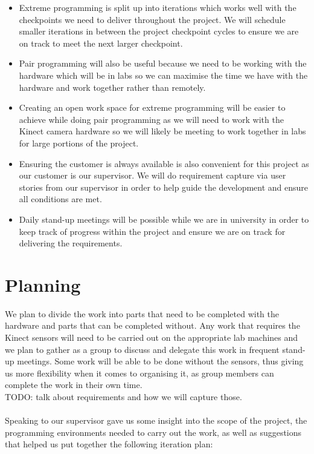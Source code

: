 \documentclass[a4paper,12pt]{article}
\begin{document}
\begin{itemize}
\item Extreme programming is split up into iterations which works well with the checkpoints we need to deliver throughout the project. We will schedule smaller iterations in between the project checkpoint cycles to ensure we are on track to meet the next larger checkpoint.
\item Pair programming will also be useful because we need to be working with the hardware which will be in labs so we can maximise the time we have with the hardware and work together rather than remotely.
\item Creating an open work space for extreme programming will be easier to achieve while doing pair programming as we will need to work with the Kinect camera hardware so we will likely be meeting to work together in labs for large portions of the project.
\item Ensuring the customer is always available is also convenient for this project as our customer is our supervisor. We will do requirement capture via user stories from our supervisor in order to help guide the development and ensure all conditions are met.
\item Daily stand-up meetings will be possible while we are in university in order to keep track of progress within the project and ensure we are on track for delivering the requirements.
\end{itemize}

\section*{Planning}
We plan to divide the work into parts that need to be completed with the hardware and parts that can be completed without. Any work that requires the Kinect sensors will need to be carried out on the appropriate lab machines and we plan to gather as a group to discuss and delegate this work in frequent stand-up meetings. Some work will be able to be done without the sensors, thus giving us more flexibility when it comes to organising it, as group members can complete the work in their own time. \\

TODO: talk about requirements and how we will capture those. \\
\\
Speaking to our supervisor gave us some insight into the scope of the project, the programming environments needed to carry out the work, as well as suggestions that helped us put together the following iteration plan:
\end{document}
